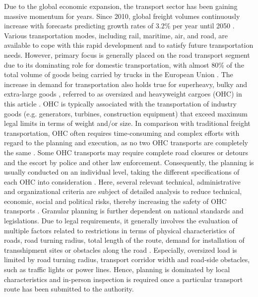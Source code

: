 
Due to the global economic expansion, the transport sector has been gaining massive momentum for years.
Since 2010, global freight volumes continuously increase with forecasts predicting growth rates of 3.2\% per year until 2050 \cite{figura2020preferences, InternationalTransportForum}.
Various transportation modes, including rail, maritime, air, and road, are available to cope with this rapid development and to satisfy future transportation needs.
However, primary focus is generally placed on the road transport segment due to its dominating role for domestic transportation, with almost 80\% of the total volume of goods being carried by trucks in the European Union \cite{Eurostat}.
The increase in demand for transportation also holds true for superheavy, bulky and extra-large goods \cite{gavrilova2021analysis}, referred to as oversized and heavyweight cargoes (OHC) in this article \cite{Luo.2021}.
OHC is typically associated with the transportation of industry goods (e.g. generators, turbines, construction equipment) that exceed maximum legal limits in terms of weight and/or size.
In comparison with traditional freight transportation, OHC often requires time-consuming and complex efforts with regard to the planning and execution, as no two OHC transports are completely the same \cite{Wolnowska.2019}.
Some OHC transports may require complete road closures or detours and the escort by police and other law enforcement.
Consequently, the planning is usually conducted on an individual level, taking the different specifications of each OHC into consideration \cite{Bazaras.2013}.
Here, several relevant technical, administrative and organizational criteria are subject of detailed analysis to reduce technical, economic, social and political risks, thereby increasing the safety of OHC transports \cite{Palsaitis.2012}.
Granular planning is further dependent on national standards and legislations. Due to legal requirements, it generally involves the evaluation of multiple factors related to restrictions in terms of physical characteristics of roads, road turning radius, total length of the route, demand for installation of transshipment sites or obstacles along the road \cite{PETRASKA.2018}.
Especially, oversized load is limited by road turning radius, transport corridor width and road-side obstacles, such as traffic lights or power lines.
Hence, planning is dominated by local characteristics and in-person inspection is required once a particular transport route has been submitted to the authority.
